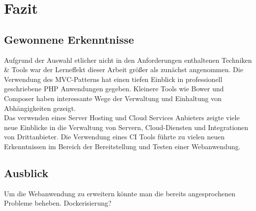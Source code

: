 \chapter{Fazit}\label{ch:fazit}
\section{Gewonnene Erkenntnisse}\label{sec:gewonnene-erkenntnisse}
Aufgrund der Auswahl etlicher nicht in den Anforderungen enthaltenen Techniken \&{} Tools war der Lerneffekt dieser Arbeit größer als zunächst angenommen. Die Verwendung des MVC-Patterns hat einen tiefen Einblick in professionell geschriebene PHP Anwendungen gegeben. Kleinere Tools wie Bower und Composer haben interessante Wege der Verwaltung und Einhaltung von Abhängigkeiten gezeigt.\\
Das verwenden eines Server Hosting und Cloud Services Anbieters zeigte viele neue Einblicke in die Verwaltung von Servern, Cloud-Diensten und Integrationen von Drittanbieter. Die Verwendung eines CI Tools führte zu vielen neuen Erkenntnissen im Bereich der Bereitstellung und Testen einer Webanwendung.

\section{Ausblick}\label{sec:ausblick}
Um die Webanwendung zu erweitern könnte man die bereits angesprochenen Probleme beheben.
Dockerisierung?